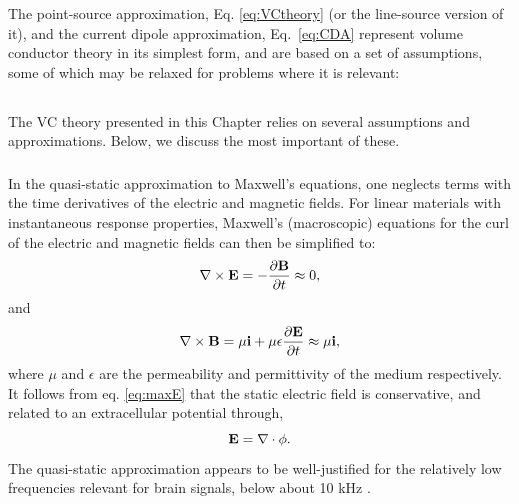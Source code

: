 The point-source approximation, Eq. \ref{eq:VCtheory} (or the line-source version of it), and the current dipole approximation, Eq.~\eqref{eq:CDA} represent volume conductor theory in its simplest form, and are based on a set of assumptions, some of which may be relaxed for problems where it is relevant: 


\subsection{}
\label{sec:approximations}
The VC theory presented in this Chapter relies on several assumptions and approximations. Below, we discuss the most important of these. 

\subsubsection{}
\label{sec:quasistatic}
In the quasi-static approximation to Maxwell's equations, one neglects terms with the time derivatives of the electric and magnetic fields. For linear materials with instantaneous response properties, Maxwell's (macroscopic) equations for the curl of the electric and magnetic fields can then be simplified to:
\begin{equation}
\nabla \times {\bf E} = - \frac{\partial {\bf B}}{\partial t}  \approx 0, 
\label{eq:maxE}
\end{equation}
and
\begin{equation}
\nabla \times {\bf B} = \mu{\bf i} + \mu \epsilon \frac{\partial {\bf E}}{\partial t} \approx  \mu {\bf i} ,
\label{eq:maxB}
\end{equation}
where $\mu$ and $\epsilon$ are the permeability and permittivity of the medium respectively. It follows from eq. \ref{eq:maxE} that the static electric field is conservative, and related to an extracellular potential through,
\begin{equation}
{\bf E} = \nabla \cdot \phi.
\label{eq:conservative}
\end{equation}
The quasi-static approximation appears to be well-justified for the relatively low frequencies relevant for brain signals, below about 10 kHz \cite{Nunez2006, Grodzinsky2011}.


